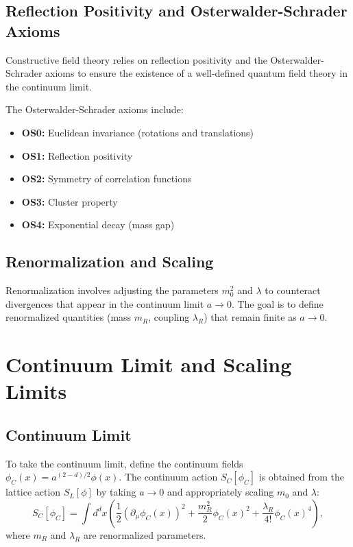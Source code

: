 \subsection{Reflection Positivity and Osterwalder-Schrader Axioms}

Constructive field theory relies on reflection positivity and the Osterwalder-Schrader axioms to ensure the existence of a well-defined quantum field theory in the continuum limit.

The Osterwalder-Schrader axioms include:
\begin{itemize}
    \item \textbf{OS0:} Euclidean invariance (rotations and translations)
    \item \textbf{OS1:} Reflection positivity
    \item \textbf{OS2:} Symmetry of correlation functions
    \item \textbf{OS3:} Cluster property
    \item \textbf{OS4:} Exponential decay (mass gap)
\end{itemize}

\subsection*{Renormalization and Scaling}

Renormalization involves adjusting the parameters \(m_0^2\) and \(\lambda\) to counteract divergences that appear in the continuum limit \(a \to 0\). The goal is to define renormalized quantities (mass \(m_R\), coupling \(\lambda_R\)) that remain finite as \(a \to 0\).



\section{Continuum Limit and Scaling Limits}

\subsection{Continuum Limit}

To take the continuum limit, define the continuum fields \(\phi_C(x) = a^{(2-d)/2} \phi(x)\). The continuum action \(S_C[\phi_C]\) is obtained from the lattice action \(S_L[\phi]\) by taking \(a \to 0\) and appropriately scaling \(m_0\) and \(\lambda\):
\begin{equation}
S_C[\phi_C] = \int d^dx \left( \frac{1}{2} (\partial_\mu \phi_C(x))^2 + \frac{m_R^2}{2} \phi_C(x)^2 + \frac{\lambda_R}{4!} \phi_C(x)^4 \right),
\end{equation}
where \(m_R\) and \(\lambda_R\) are renormalized parameters.

